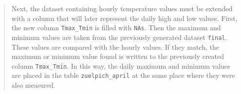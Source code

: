 \documentclass[
]{book}
\newenvironment{Shaded}{\begin{snugshade}}{\end{snugshade}}
\newcommand{\CommentTok}[1]{\textcolor[rgb]{0.56,0.35,0.01}{\textit{#1}}}
\newcommand{\ControlFlowTok}[1]{\textcolor[rgb]{0.13,0.29,0.53}{\textbf{#1}}}
\newcommand{\DataTypeTok}[1]{\textcolor[rgb]{0.13,0.29,0.53}{#1}}
\newcommand{\DecValTok}[1]{\textcolor[rgb]{0.00,0.00,0.81}{#1}}
\newcommand{\KeywordTok}[1]{\textcolor[rgb]{0.13,0.29,0.53}{\textbf{#1}}}
\newcommand{\NormalTok}[1]{#1}
\newcommand{\OperatorTok}[1]{\textcolor[rgb]{0.81,0.36,0.00}{\textbf{#1}}}
\newcommand{\OtherTok}[1]{\textcolor[rgb]{0.56,0.35,0.01}{#1}}
\newcommand{\StringTok}[1]{\textcolor[rgb]{0.31,0.60,0.02}{#1}}
\begin{document}
\begin{quote}
Next, the dataset containing hourly temperature values must be extended with a column that will later represent the daily high and low values. First, the new column \texttt{Tmax\_Tmin} is filled with \texttt{NAs}. Then the maximum and minimum values are taken from the previously generated dataset \texttt{final}. These values are compared with the hourly values. If they match, the maximum or minimum value found is written to the previously created column \texttt{Tmax\_Tmin}. In this way, the daily maximum and minimum values are placed in the table \texttt{zuelpich\_april} at the same place where they were also measured.
\end{quote}

\begin{Shaded}
\end{Shaded}
\end{document}
